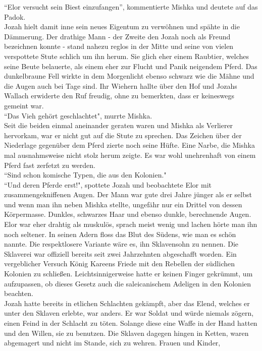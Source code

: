 ``Elor versucht sein Biest einzufangen'', kommentierte Mishka und deutete auf das Padok.\\
Jozah hielt damit inne sein neues Eigentum zu verwöhnen und spähte in die Dämmerung. Der drathige 
Mann - der Zweite den Jozah noch als Freund bezeichnen konnte - stand nahezu reglos in der Mitte 
und seine von vielen verspottete Stute schlich um ihn herum. Sie glich eher einem Raubtier, welches 
seine Beute belauerte, als einem eher zur Flucht und Panik neigendem Pferd. Das dunkelbraune Fell 
wirkte in dem Morgenlicht ebenso schwarz wie die Mähne und die Augen auch bei Tage sind. Ihr 
Wiehern hallte über den Hof und Jozahs Wallach erwiderte den Ruf freudig, ohne zu bemerkten, dass 
er keineswegs gemeint war. \\
``Das Vieh gehört geschlachtet", murrte Mishka.\\
Seit die beiden einmal aneinander geraten waren und Mishka als Verlierer hervorkam, war er nicht 
gut auf die Stute zu sprechen. Das Zeichen über der Niederlage gegenüber dem Pferd zierte noch 
seine Hüfte. Eine Narbe, die Mishka mal ausnahmsweise nicht stolz herum zeigte. Es war wohl 
unehrenhaft von einem Pferd fast zerfetzt zu werden. \\
``Sind schon komische Typen, die aus den Kolonien."\\ 
``Und deren Pferde erst!", spottete Jozah und beobachtete Elor mit zusammengekniffenen Augen. 
Der Mann war gute drei Jahre jünger als er selbst und wenn man ihn neben Mishka stellte, ungefähr 
nur ein Drittel von dessen Körpermasse. Dunkles, schwarzes Haar und ebenso dunkle, berechnende 
Augen. Elor war eher drahtig als muskulös, sprach meist wenig und lachen hörte man ihn noch 
seltener. In seinen Adern floss das Blut des Südens, wie man es schön nannte. Die respektlosere 
Variante wäre es, ihn Sklavensohn zu nennen. Die Sklaverei war offiziell bereits seit zwei 
Jahrzehnten abgeschafft worden. Ein vergeblicher Versuch König Kareens Friede mit den Rebellen der 
südlichen Kolonien zu schließen. Leichtsinnigerweise hatte er keinen Finger gekrümmt, um 
aufzupassen, ob dieses Gesetz auch die saleicanischem Adeligen in den Kolonien beachten.\\
Jozah hatte bereits in etlichen Schlachten gekämpft, aber das Elend, welches er unter den Sklaven 
erlebte, war anders. Er war Soldat und würde niemals zögern, einen Feind in der Schlacht zu töten. 
Solange diese eine Waffe in der Hand hatten und den Willen, sie zu benutzen. Die Sklaven dagegen 
hingen in Ketten, waren abgemagert und nicht im Stande, sich zu wehren. Frauen und Kinder, 
